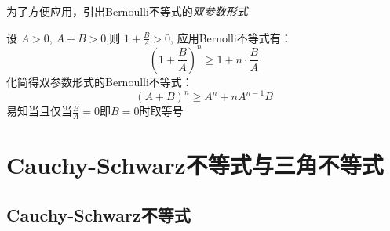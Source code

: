 为了方便应用，引出Bernoulli不等式的\emph{双参数形式}
\begin{proposition}
    设 $ A > 0 $, $ A + B > 0 $,则 $ 1 + \frac{B}{A} > 0$, 应用Bernolli不等式有：
    \begin{equation*}
        \left( 1 + \frac{B}{A} \right)^n \geq 1 + n \cdot \frac{B}{A}
    \end{equation*}
    化简得双参数形式的Bernoulli不等式：
    \begin{equation*}
        (A + B)^n \geq A^n + nA^{n-1}B
    \end{equation*}
    易知当且仅当$\frac{B}{A} = 0$即$B = 0$时取等号
\end{proposition}

\section{Cauchy-Schwarz不等式与三角不等式}
\subsection*{Cauchy-Schwarz不等式}
